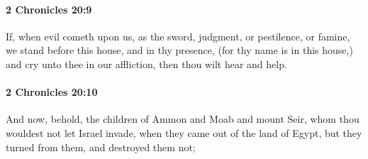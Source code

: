 		\paragraph{2 Chronicles 20:9} %
			\label{2CHRONICLES-20-9}

			If, when evil cometh upon us, as the sword, judgment, or pestilence, or famine, we stand before this house, and in thy presence, (for thy name is in this house,) and cry unto thee in our affliction, then thou wilt hear and help.


		\paragraph{2 Chronicles 20:10} %
			\label{2CHRONICLES-20-10}

			And now, behold, the children of Ammon and Moab and mount Seir, whom thou wouldest not let Israel invade, when they came out of the land of Egypt, but they turned from them, and destroyed them not;

